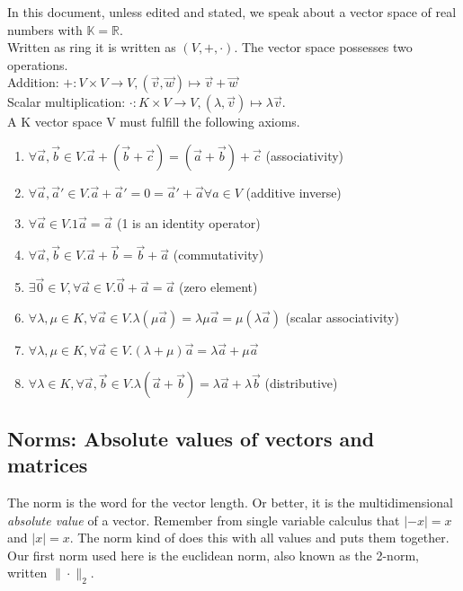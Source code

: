 \documentclass[a4paper]{article}
\begin{document}
\begin{Example}
In this document, unless edited and stated, we speak about a vector space of real numbers with $\mathbb{K} = \mathbb{R}$.\\

Written as ring it is written as $(V, +, \cdot)$. The vector space possesses two operations.\\

Addition: $+: V \times V \rightarrow V, (\vec{v},\vec{w}) \mapsto \vec{v}+\vec{w}$\\
Scalar multiplication: $\cdot: K \times V \rightarrow V, (\lambda, \vec{v}) \mapsto \lambda\vec{v}$.\\

A K vector space V must fulfill the following axioms.\\

\begin{enumerate}
\label{kvs_axioms}
\item $\forall \vec{a},\vec{b} \in V. \vec{a}+(\vec{b}+\vec{c}) = (\vec{a}+\vec{b})+\vec{c}$ (associativity)
\item $\forall \vec{a},\vec{a}' \in V. \vec{a} + \vec{a}' = 0 = \vec{a}' + \vec{a} \forall a \in V$ (additive inverse)
\item $\forall \vec{a} \in V. 1\vec{a} = \vec{a}$    (1 is an identity operator)
\item $\forall \vec{a},\vec{b} \in V.  \vec{a}+\vec{b}=\vec{b}+\vec{a}$ (commutativity)
\item $\exists \vec{0} \in V,\forall \vec{a} \in V. \vec{0}+\vec{a}=\vec{a}$ (zero element)
\item $\forall \lambda,\mu \in K, \forall \vec{a} \in V. \lambda(\mu\vec{a})=\lambda\mu\vec{a}=\mu(\lambda\vec{a})$ (scalar associativity)
\item $\forall \lambda,\mu \in K, \forall \vec{a} \in V. (\lambda + \mu)\vec{a} = \lambda\vec{a}+\mu\vec{a}$
\item $\forall \lambda \in K, \forall \vec{a}, \vec{b} \in V. \lambda(\vec{a}+\vec{b}) = \lambda\vec{a}+\lambda\vec{b}$  (distributive)
\end{enumerate}

\subsection{Norms: Absolute values of vectors and matrices}



The norm is the word for the vector length. Or better, it is the multidimensional \emph{absolute value} of a vector. Remember from single variable calculus that $|-x|=x$ and $|x|=x$. The norm kind of does this with all values and puts them together.
Our first norm used here is the euclidean norm, also known as the 2-norm, written $\|\cdot\|_{2}$. \\


\end{Example}
\end{document}
